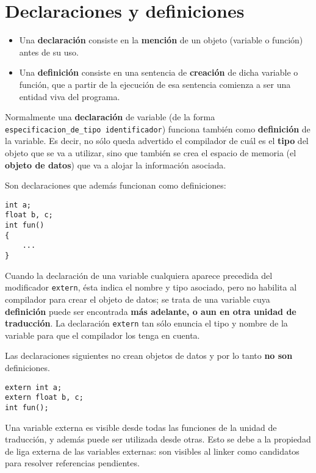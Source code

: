 \section{Declaraciones y definiciones}
\begin{itemize}
	\item Una \textbf{declaración} consiste en la \textbf{mención} de un objeto (variable o función) antes de su uso.
	\item Una \textbf{definición} consiste en una sentencia de \textbf{creación} de dicha variable o función, que a partir de la ejecución de esa sentencia comienza a ser una entidad viva del programa.
\end{itemize}


Normalmente una \textbf{declaración} de variable (de la forma \lstinline{especificacion_de_tipo identificador}) funciona
también como \textbf{definición} de la variable. Es decir, no sólo queda advertido el compilador de cuál es el
\textbf{tipo} del objeto que se va a utilizar, sino que también se crea el espacio de memoria (el \textbf{objeto de datos})
que va a alojar la información asociada.

\begin{ejemplo}
Son declaraciones que además funcionan como definiciones:
\begin{lstlisting}
int a;
float b, c;
int fun() 
{
	...
}
\end{lstlisting}
\end{ejemplo}


Cuando la declaración de una variable cualquiera aparece precedida del modificador \lstinline{extern}, ésta indica el nombre y tipo asociado, pero no habilita al compilador para crear el objeto de datos; se trata de una variable cuya \textbf{definición} puede ser encontrada
\textbf{más adelante, o aun en otra unidad de traducción}. La declaración \lstinline{extern} tan sólo enuncia el tipo y nombre de la variable para que el compilador los tenga en cuenta.

\begin{ejemplo}
Las declaraciones siguientes no crean objetos de datos y por lo tanto \textbf{no son} definiciones.
\begin{lstlisting}
extern int a;
extern float b, c;
int fun();
\end{lstlisting}
\end{ejemplo}

Una variable externa es visible desde todas las funciones de la unidad de traducción, y además puede ser
utilizada desde otras. Esto se debe a la propiedad de liga externa de las variables externas: son visibles
al linker como candidatos para resolver referencias pendientes.

